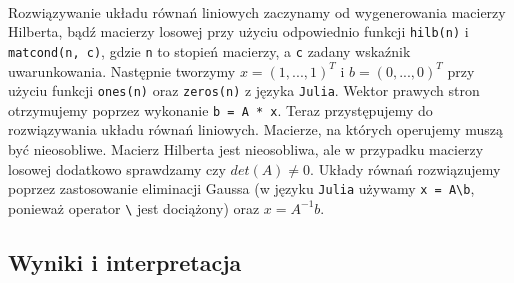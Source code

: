 \documentclass[a4paper]{article}
\begin{document}
\paragraph{}
Rozwiązywanie układu równań liniowych zaczynamy od wygenerowania macierzy Hilberta, bądź macierzy losowej przy użyciu odpowiednio funkcji \texttt{hilb(n)} i \texttt{matcond(n, c)}, gdzie \texttt{n} to stopień macierzy, a \texttt{c} zadany wskaźnik uwarunkowania. Następnie tworzymy $x = (1, ..., 1)^T$ i $b = (0, ..., 0)^T$ przy użyciu funkcji \texttt{ones(n)} oraz \texttt{zeros(n)} z języka \texttt{Julia}. Wektor prawych stron otrzymujemy poprzez wykonanie \texttt{b = A * x}. Teraz przystępujemy do rozwiązywania układu równań liniowych. Macierze, na których operujemy muszą być nieosobliwe. Macierz Hilberta jest nieosobliwa, ale w przypadku macierzy losowej dodatkowo sprawdzamy czy $det(A) \neq 0$. Układy równań rozwiązujemy poprzez zastosowanie eliminacji Gaussa (w języku \texttt{Julia} używamy \texttt{x = A\textbackslash b}, ponieważ operator \texttt{\textbackslash} jest dociążony) oraz $x = A^{-1}b$.
\subsection{Wyniki i interpretacja}
\paragraph{}
\end{document}
